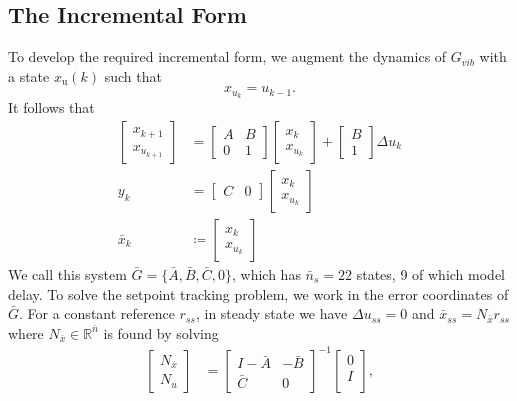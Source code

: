 \documentclass[journal,twocolumn,twoside]{IEEEtran}
\newcommand{\du}{\ensuremath{\Delta u }\xspace}
\newcommand{\Gd}{\ensuremath{\bar G }\xspace}
\newcommand{\Ad}{\ensuremath{\bar A }\xspace}
\newcommand{\Bd}{\ensuremath{\bar B }\xspace}
\newcommand{\Cd}{\ensuremath{\bar C }\xspace}
\newcommand{\xd}{\ensuremath{\bar x }\xspace}
\newcommand{\x}{\ensuremath{x }\xspace}
\newcommand{\xdss}{\ensuremath{\bar x_{ss} }\xspace}
\newcommand{\y}{\ensuremath{y} \xspace}
\begin{document}
\subsection{The Incremental Form}\label{sec:incremental}
To develop the required incremental form, we augment the dynamics of \(G_{vib}\) with a state \(\x_{\text{u}}(k)\) such that
\begin{equation*}
  \x_{u_k} = u_{k-1}.
\end{equation*}
It follows that
\begin{subequations}
\begin{align}
  \begin{bmatrix}\x_{k+1}\\\x_{u_{k+1}}\end{bmatrix}
  &=
    \begin{bmatrix}
      A & B\\ 0 & 1
    \end{bmatrix}
    \begin{bmatrix}\x_k\\\x_{u_k}\end{bmatrix}
    +
    \begin{bmatrix}
      B\\1
    \end{bmatrix}
  \Delta u_k \label{eqn:deltadyn} \\
  \y_k & = \begin{bmatrix}C & 0\end{bmatrix}\begin{bmatrix}\x_k\\\x_{u_k}\end{bmatrix}\\
    \xd_k& \coloneqq
    \begin{bmatrix}\x_k\\\x_{u_k} \end{bmatrix}
\end{align}\label{eqn:ssdelta}%
\end{subequations}
We call this system \(\Gd = \{\Ad, \Bd, \Cd, 0\}\), which has \({\bar{n}_s=22}\) states, 9 of which model delay.
To solve the setpoint tracking problem, we work in the error
coordinates of \(\Gd\).
For a constant reference \(r_{ss}\), in steady state we have \({\du_{ss}=0}\) and \({\xdss =N_{\xd}r_{ss}}\) where \({N_{\xd}\in\mathds{R}^{\bar{n}}}\) is found by solving
\begin{align}
  \begin{bmatrix}N_{\xd} \\ N_u\end{bmatrix} &=
\begin{bmatrix}I-\Ad & -\Bd\\\Cd & 0\end{bmatrix}^{-1}\begin{bmatrix}0\\ I\\\end{bmatrix}\label{eqn:nxnu},
\end{align}
\end{document}
